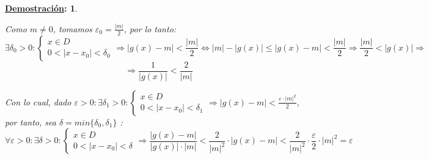 \documentclass[10pt,a4paper,openright]{book}
\theoremstyle{break}
\newtheorem*{demo}{\underline{Demostración}:}
\begin{document}
\begin{demo}
\begin{enumerate}
Como $m\neq 0$, tomamos $\varepsilon_0=\frac{|m|}{2}$, por lo tanto:
$$\exists \delta_0>0: \begin{cases} x\in D\\ 0<|x-x_0|<\delta_0\end{cases}\Rightarrow |g(x)-m|<\frac{|m|}{2}\Leftrightarrow |m|-|g(x)|\leq |g(x)-m|<\frac{|m|}{2} \Rightarrow \frac{|m|}{2}<|g(x)|\Rightarrow$$
$$\Rightarrow \frac{1}{|g(x)|}<\frac{2}{|m|}$$

Con lo cual, dado $\varepsilon>0: \exists \delta_1>0: \begin{cases} x\in D\\ 0<|x-x_0|<\delta_1\end{cases}\Rightarrow |g(x)-m|<\frac{\varepsilon\cdot |m|^2}{2}$, por tanto, sea $\delta=min\{\delta_0, \delta_1\}$ :
$$\forall \varepsilon>0: \exists \delta>0: \begin{cases} x\in D\\ 0<|x-x_0|<\delta\end{cases}\Rightarrow \frac{|g(x)-m|}{|g(x)|\cdot |m|}<\frac{2}{|m|^2}\cdot |g(x)-m|<\frac{2}{|m|^2}\cdot \frac{\varepsilon}{2}\cdot |m|^2=\varepsilon$$
\end{enumerate}
\end{demo}
\end{document}
